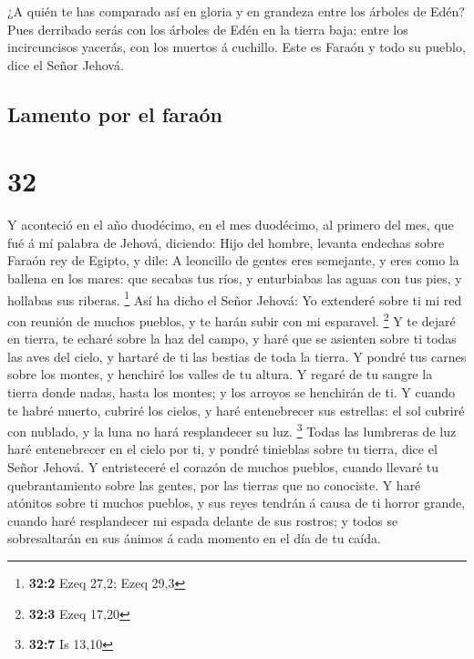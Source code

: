  ¿A quién te has comparado así en gloria y en grandeza
entre los árboles de Edén? Pues derribado serás con los árboles de Edén
en la tierra baja: entre los incircuncisos yacerás, con los muertos á
cuchillo. Este es Faraón y todo su pueblo, dice el Señor Jehová.

\hypertarget{lamento-por-el-farauxf3n}{%
\subsection{Lamento por el faraón}\label{lamento-por-el-farauxf3n}}

\hypertarget{section-31}{%
\section{32}\label{section-31}}

 Y aconteció en el año duodécimo, en el mes duodécimo, al
primero del mes, que fué á mí palabra de Jehová, diciendo:
 Hijo del hombre, levanta endechas sobre Faraón rey de
Egipto, y dile: A leoncillo de gentes eres semejante, y eres como la
ballena en los mares: que secabas tus ríos, y enturbiabas las aguas con
tus pies, y hollabas sus riberas. \footnote{\textbf{32:2} Ezeq 27,2;
  Ezeq 29,3}  Así ha dicho el Señor Jehová: Yo extenderé
sobre ti mi red con reunión de muchos pueblos, y te harán subir con mi
esparavel. \footnote{\textbf{32:3} Ezeq 17,20}  Y te
dejaré en tierra, te echaré sobre la haz del campo, y haré que se
asienten sobre ti todas las aves del cielo, y hartaré de ti las bestias
de toda la tierra.  Y pondré tus carnes sobre los montes,
y henchiré los valles de tu altura.  Y regaré de tu sangre
la tierra donde nadas, hasta los montes; y los arroyos se henchirán de
ti.  Y cuando te habré muerto, cubriré los cielos, y haré
entenebrecer sus estrellas: el sol cubriré con nublado, y la luna no
hará resplandecer su luz. \footnote{\textbf{32:7} Is 13,10}
 Todas las lumbreras de luz haré entenebrecer en el cielo
por ti, y pondré tinieblas sobre tu tierra, dice el Señor Jehová.
 Y entristeceré el corazón de muchos pueblos, cuando
llevaré tu quebrantamiento sobre las gentes, por las tierras que no
conociste.  Y haré atónitos sobre ti muchos pueblos, y
sus reyes tendrán á causa de ti horror grande, cuando haré resplandecer
mi espada delante de sus rostros; y todos se sobresaltarán en sus ánimos
á cada momento en el día de tu caída.

